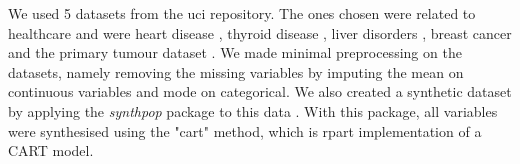 We used 5 datasets from the \ac{uci} repository. The ones chosen were related to healthcare and were heart disease \cite{misc_heart_disease_45}, thyroid disease \cite{misc_thyroid_disease_102}, liver disorders \cite{misc_liver_disorders_60}, breast cancer \cite{misc_breast_cancer_wisconsin_diagnostic_17} and the primary tumour dataset \cite{misc_primary_tumor_83}. We made minimal preprocessing on the datasets, namely removing the missing variables by imputing the mean on continuous variables and mode on categorical.
We also created a synthetic dataset by applying the \textit{synthpop} package to this data \cite{synthpop}. With this package, all variables were synthesised using the "cart" method, which is rpart implementation of a CART model.

